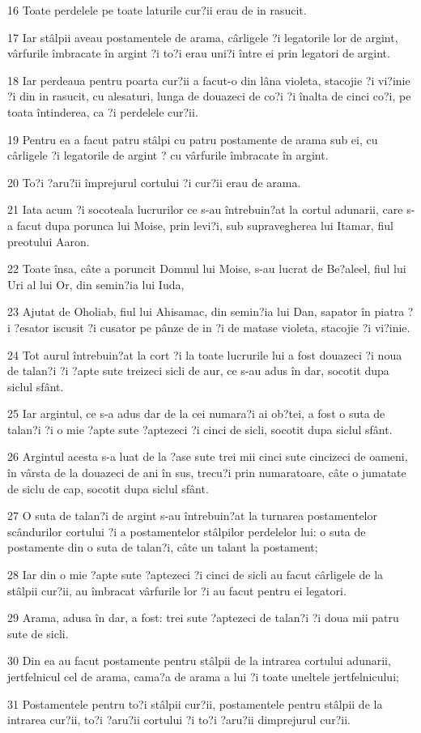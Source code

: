 \par 16 Toate perdelele pe toate laturile cur?ii erau de in rasucit.
\par 17 Iar stâlpii aveau postamentele de arama, cârligele ?i legatorile lor de argint, vârfurile îmbracate în argint ?i to?i erau uni?i între ei prin legatori de argint.
\par 18 Iar perdeaua pentru poarta cur?ii a facut-o din lâna violeta, stacojie ?i vi?inie ?i din in rasucit, cu alesaturi, lunga de douazeci de co?i ?i înalta de cinci co?i, pe toata întinderea, ca ?i perdelele cur?ii.
\par 19 Pentru ea a facut patru stâlpi cu patru postamente de arama sub ei, cu cârligele ?i legatorile de argint ? cu vârfurile îmbracate în argint.
\par 20 To?i ?aru?ii împrejurul cortului ?i cur?ii erau de arama.
\par 21 Iata acum ?i socoteala lucrurilor ce s-au întrebuin?at la cortul adunarii, care s-a facut dupa porunca lui Moise, prin levi?i, sub supravegherea lui Itamar, fiul preotului Aaron.
\par 22 Toate însa, câte a poruncit Domnul lui Moise, s-au lucrat de Be?aleel, fiul lui Uri al lui Or, din semin?ia lui Iuda,
\par 23 Ajutat de Oholiab, fiul lui Ahisamac, din semin?ia lui Dan, sapator în piatra ?i ?esator iscusit ?i cusator pe pânze de in ?i de matase violeta, stacojie ?i vi?inie.
\par 24 Tot aurul întrebuin?at la cort ?i la toate lucrurile lui a fost douazeci ?i noua de talan?i ?i ?apte sute treizeci sicli de aur, ce s-au adus în dar, socotit dupa siclul sfânt.
\par 25 Iar argintul, ce s-a adus dar de la cei numara?i ai ob?tei, a fost o suta de talan?i ?i o mie ?apte sute ?aptezeci ?i cinci de sicli, socotit dupa siclul sfânt.
\par 26 Argintul acesta s-a luat de la ?ase sute trei mii cinci sute cincizeci de oameni, în vârsta de la douazeci de ani în sus, trecu?i prin numaratoare, câte o jumatate de siclu de cap, socotit dupa siclul sfânt.
\par 27 O suta de talan?i de argint s-au întrebuin?at la turnarea postamentelor scândurilor cortului ?i a postamentelor stâlpilor perdelelor lui: o suta de postamente din o suta de talan?i, câte un talant la postament;
\par 28 Iar din o mie ?apte sute ?aptezeci ?i cinci de sicli au facut cârligele de la stâlpii cur?ii, au îmbracat vârfurile lor ?i au facut pentru ei legatori.
\par 29 Arama, adusa în dar, a fost: trei sute ?aptezeci de talan?i ?i doua mii patru sute de sicli.
\par 30 Din ea au facut postamente pentru stâlpii de la intrarea cortului adunarii, jertfelnicul cel de arama, cama?a de arama a lui ?i toate uneltele jertfelnicului;
\par 31 Postamentele pentru to?i stâlpii cur?ii, postamentele pentru stâlpii de la intrarea cur?ii, to?i ?aru?ii cortului ?i to?i ?aru?ii dimprejurul cur?ii.

